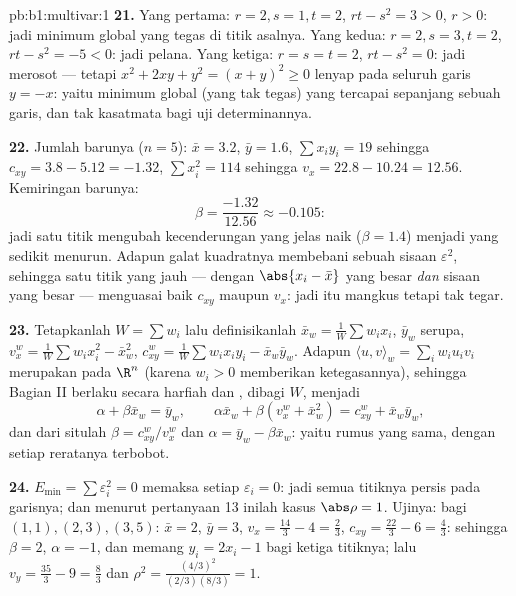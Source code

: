 \begin{solution}{pb:b1:multivar:1}
\textbf{21.} Yang pertama: $r = 2, s = 1, t = 2$, $rt - s^2 = 3 > 0$,
$r > 0$: jadi minimum global yang tegas di titik asalnya. Yang kedua: $r = 2, s
= 3, t = 2$, $rt - s^2 = -5 < 0$: jadi pelana. Yang ketiga: $r = s = t =
2$, $rt - s^2 = 0$: jadi merosot --- tetapi $x^2 + 2xy + y^2 = (x +
y)^2 \geq 0$ lenyap pada seluruh garis $y = -x$: yaitu
minimum global (yang tak tegas) yang tercapai sepanjang sebuah garis, dan tak kasatmata bagi
uji determinannya.

\textbf{22.} Jumlah barunya ($n = 5$): $\bar x = 3.2$, $\bar y =
1.6$, $\sum x_iy_i = 19$ sehingga $c_{xy} = 3.8 - 5.12 = -1.32$,
$\sum x_i^2 = 114$ sehingga $v_x = 22.8 - 10.24 = 12.56$. Kemiringan barunya:
\[
\beta = \frac{-1.32}{12.56} \approx -0.105 :
\]
jadi satu titik mengubah kecenderungan yang jelas naik ($\beta = 1.4$) menjadi
yang sedikit menurun. Adapun galat kuadratnya membebani sebuah sisaan
$\varepsilon^2$, sehingga satu titik yang jauh --- dengan
$\abs{x_{i} - \bar x}$ yang besar \emph{dan} sisaan yang besar --- menguasai
baik $c_{xy}$ maupun $v_x$: jadi  itu mangkus tetapi tak
tegar.

\textbf{23.} Tetapkanlah $W = \sum w_i$ lalu definisikanlah $\bar x_w =
\frac1W\sum w_ix_i$, $\bar y_w$ serupa, $v_x^w = \frac1W\sum
w_ix_i^2 - \bar x_w^2$, $c^w_{xy} = \frac1W\sum w_ix_iy_i - \bar
x_w\bar y_w$. Adapun  $\langle u, v\rangle_w = \sum_i w_iu_iv_i$
merupakan  pada $\R^n$ (karena $w_i > 0$ memberikan ketegasannya), sehingga
Bagian II berlaku secara harfiah dan , dibagi $W$,
menjadi
\[
\alpha + \beta\bar x_w = \bar y_w,
\qquad
\alpha\bar x_w + \beta(v^w_x + \bar x_w^2) = c^w_{xy} + \bar
x_w\bar y_w ,
\]
dan dari situlah $\beta = c^w_{xy}/v^w_x$ dan $\alpha = \bar y_w -
\beta\bar x_w$: yaitu rumus yang sama, dengan setiap reratanya terbobot.

\textbf{24.} $E_{\min} = \sum\varepsilon_i^2 = 0$ memaksa setiap
$\varepsilon_i = 0$: jadi semua titiknya persis pada garisnya; dan menurut pertanyaan
13 inilah kasus $\abs\rho = 1$. Ujinya: bagi $(1,1), (2,3),
(3,5)$: $\bar x = 2$, $\bar y = 3$, $v_x = \frac{14}3 - 4 =
\frac23$, $c_{xy} = \frac{22}3 - 6 = \frac43$: sehingga $\beta = 2$,
$\alpha = -1$, dan memang $y_i = 2x_i - 1$ bagi ketiga titiknya;
lalu $v_y = \frac{35}3 - 9 = \frac83$ dan $\rho^2 =
\frac{(4/3)^2}{(2/3)(8/3)} = 1$.


\end{solution}
